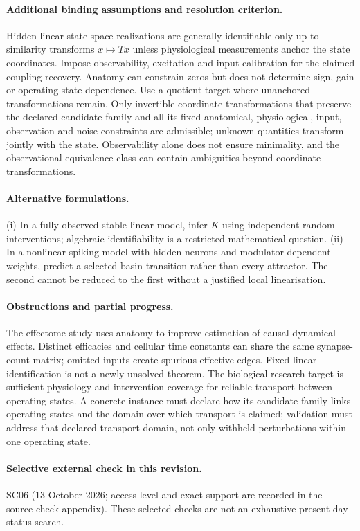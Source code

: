 \documentclass[11pt]{article}
\begin{document}
\paragraph{Additional binding assumptions and resolution criterion.} Hidden linear state-space realizations are generally identifiable only up to similarity transforms $x\mapsto Tx$ unless physiological measurements anchor the state coordinates. Impose observability, excitation and input calibration for the claimed coupling recovery. Anatomy can constrain zeros but does not determine sign, gain or operating-state dependence. Use a quotient target where unanchored transformations remain. Only invertible coordinate transformations that preserve the declared candidate family and all its fixed anatomical, physiological, input, observation and noise constraints are admissible; unknown quantities transform jointly with the state. Observability alone does not ensure minimality, and the observational equivalence class can contain ambiguities beyond coordinate transformations.

\paragraph{Alternative formulations.} (i) In a fully observed stable linear model, infer $K$ using independent random interventions; algebraic identifiability is a restricted mathematical question. (ii) In a nonlinear spiking model with hidden neurons and modulator-dependent weights, predict a selected basin transition rather than every attractor. The second cannot be reduced to the first without a justified local linearisation.
\paragraph{Obstructions and partial progress.} The effectome study uses anatomy to improve estimation of causal dynamical effects. Distinct efficacies and cellular time constants can share the same synapse-count matrix; omitted inputs create spurious effective edges. Fixed linear identification is not a newly unsolved theorem. The biological research target is sufficient physiology and intervention coverage for reliable transport between operating states. A concrete instance must declare how its candidate family links operating states and the domain over which transport is claimed; validation must address that declared transport domain, not only withheld perturbations within one operating state.
\paragraph{Selective external check in this revision.} SC06 (13 October 2026; access level and exact support are recorded in the source-check appendix). These selected checks are not an exhaustive present-day status search.
\end{document}
